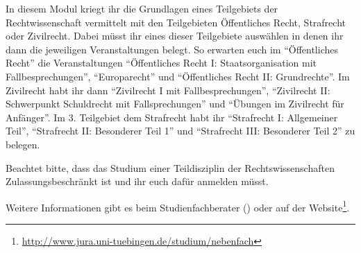 
In diesem Modul kriegt ihr die Grundlagen eines Teilgebiets der Rechtwissenschaft vermittelt mit den Teilgebieten Öffentliches Recht, Strafrecht oder Zivilrecht. Dabei müsst ihr eines dieser Teilgebiete auswählen in denen ihr dann die jeweiligen Veranstaltungen belegt. So erwarten euch im "`Öffentliches Recht"' die Veranstaltungen "`Öffentliches Recht I: Staatsorganisation mit Fallbesprechungen"', "`Europarecht"' und "`Öffentliches Recht II: Grundrechte"'. Im Zivilrecht habt ihr dann "`Zivilrecht I mit Fallbesprechungen"', "`Zivilrecht II: Schwerpunkt Schuldrecht mit Fallsprechungen"' und "`Übungen im Zivilrecht für Anfänger"'. Im 3. Teilgebiet dem Strafrecht habt ihr "`Strafrecht I: Allgemeiner Teil"', "`Strafrecht II: Besonderer Teil 1"' und "`Strafrecht III: Besonderer Teil 2"' zu belegen.

Beachtet bitte, dass das Studium einer Teildisziplin der Rechtswissenschaften Zulassungsbeschränkt ist und ihr euch dafür anmelden müsst.

Weitere Informationen gibt es beim Studienfach\-be\-rater () oder auf der Website\footnote{\url{http://www.jura.uni-tuebingen.de/studium/nebenfach}}.


